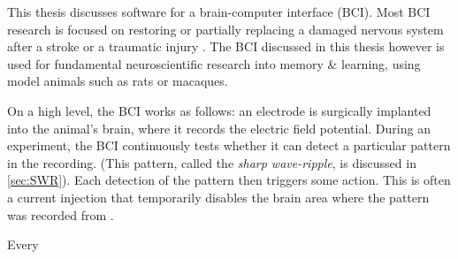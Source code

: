 

\label{sec:BCI}

This thesis discusses software for a brain-computer interface (BCI).\footnotemark{} Most BCI research is focused on restoring or partially replacing a damaged nervous system after a stroke or a traumatic injury \cite{Krucoff2016}. The BCI discussed in this thesis however is used for fundamental neuroscientific research into memory \& learning, using model animals such as rats or macaques.


On a high level, the BCI works as follows: an electrode is surgically implanted into the animal's brain, where it records the electric field potential. During an experiment, the BCI continuously tests whether it can detect a particular pattern in the recording. (This pattern, called the \emph{sharp wave-ripple}, is discussed in \cref{sec:SWR}). Each detection of the pattern then triggers some action. This is often a current injection that temporarily disables the brain area where the pattern was recorded from \cite{Ego-Stengel2009,Girardeau2009,Jadhav2012,Girardeau2014,Talakoub2016}.


\label{sec:SWR}

Every 


